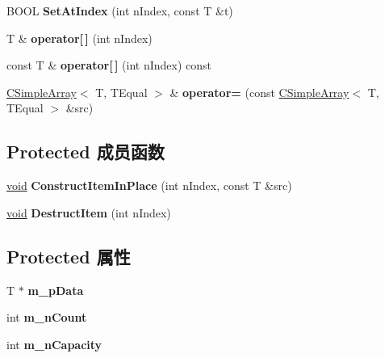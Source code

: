\begin{DoxyCompactItemize}
\mbox{\label{class_a_t_l_1_1_c_simple_array_ab07c8f92c01b611afe2e3d765d84ccc9}} 
B\+O\+OL {\bfseries Set\+At\+Index} (int n\+Index, const T \&t)
\item 
\mbox{\label{class_a_t_l_1_1_c_simple_array_a1c0ecf8a6682253f57452694a60392ff}} 
T \& {\bfseries operator\mbox{[}$\,$\mbox{]}} (int n\+Index)
\item 
\mbox{\label{class_a_t_l_1_1_c_simple_array_a484f89cc52d4ae55de4ee2ce95257518}} 
const T \& {\bfseries operator\mbox{[}$\,$\mbox{]}} (int n\+Index) const
\item 
\mbox{\label{class_a_t_l_1_1_c_simple_array_a112c89ad44f52718549864eb304dd01f}} 
\hyperlink{class_a_t_l_1_1_c_simple_array}{C\+Simple\+Array}$<$ T, T\+Equal $>$ \& {\bfseries operator=} (const \hyperlink{class_a_t_l_1_1_c_simple_array}{C\+Simple\+Array}$<$ T, T\+Equal $>$ \&src)
\end{DoxyCompactItemize}
\subsection*{Protected 成员函数}
\begin{DoxyCompactItemize}
\item 
\mbox{\label{class_a_t_l_1_1_c_simple_array_abed3b9be6b2e819cc2a6c737f52f6544}} 
\hyperlink{interfacevoid}{void} {\bfseries Construct\+Item\+In\+Place} (int n\+Index, const T \&src)
\item 
\mbox{\label{class_a_t_l_1_1_c_simple_array_ae0032863f4d63b5614b3bc110a38e72a}} 
\hyperlink{interfacevoid}{void} {\bfseries Destruct\+Item} (int n\+Index)
\end{DoxyCompactItemize}
\subsection*{Protected 属性}
\begin{DoxyCompactItemize}
\item 
\mbox{\label{class_a_t_l_1_1_c_simple_array_a0c8db145ad892bae1f91cd20f54dd126}} 
T $\ast$ {\bfseries m\+\_\+p\+Data}
\item 
\mbox{\label{class_a_t_l_1_1_c_simple_array_a8c292ec5161e478025b1d14f7bd506a2}} 
int {\bfseries m\+\_\+n\+Count}
\item 
\mbox{\label{class_a_t_l_1_1_c_simple_array_a98adb68ab3bcf0181537392961e6256b}} 
int {\bfseries m\+\_\+n\+Capacity}
\end{DoxyCompactItemize}
